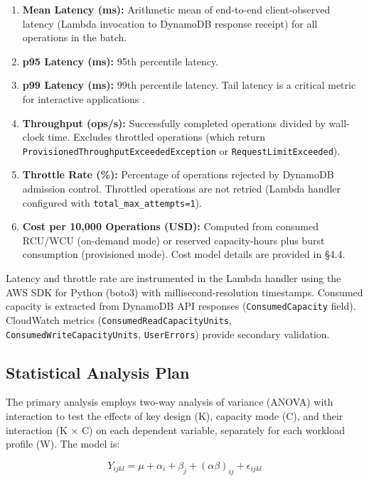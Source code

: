 \begin{enumerate}
    \item \textbf{Mean Latency (ms):} Arithmetic mean of end-to-end client-observed latency (Lambda invocation to DynamoDB response receipt) for all operations in the batch.
    \item \textbf{p95 Latency (ms):} 95th percentile latency.
    \item \textbf{p99 Latency (ms):} 99th percentile latency. Tail latency is a critical metric for interactive applications \citep{ziegler2023oltp}.
    \item \textbf{Throughput (ops/s):} Successfully completed operations divided by wall-clock time. Excludes throttled operations (which return \texttt{ProvisionedThroughputExceededException} or \texttt{RequestLimitExceeded}).
    \item \textbf{Throttle Rate (\%):} Percentage of operations rejected by DynamoDB admission control. Throttled operations are not retried (Lambda handler configured with \texttt{total\_max\_attempts=1}).
    \item \textbf{Cost per 10,000 Operations (USD):} Computed from consumed RCU/WCU (on-demand mode) or reserved capacity-hours plus burst consumption (provisioned mode). Cost model details are provided in §4.4.
\end{enumerate}

Latency and throttle rate are instrumented in the Lambda handler using the AWS SDK for Python (boto3) with millisecond-resolution timestamps. Consumed capacity is extracted from DynamoDB API responses (\texttt{ConsumedCapacity} field). CloudWatch metrics (\texttt{ConsumedReadCapacityUnits}, \texttt{ConsumedWriteCapacityUnits}, \texttt{UserErrors}) provide secondary validation.

\subsection{Statistical Analysis Plan}

The primary analysis employs two-way analysis of variance (ANOVA) with interaction to test the effects of key design (K), capacity mode (C), and their interaction (K × C) on each dependent variable, separately for each workload profile (W). The model is:

\begin{equation}
Y_{ijkl} = \mu + \alpha_i + \beta_j + (\alpha\beta)_{ij} + \epsilon_{ijkl}
\end{equation}

